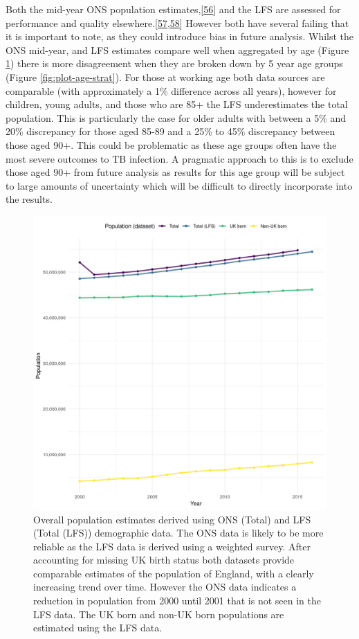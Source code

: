 \documentclass[11pt,twoside]{bristolthesis}
\begin{document}
  Both the mid-year ONS population estimates,{[}\protect\hyperlink{ref-storey2016}{56}{]} and the LFS are assessed for performance and quality elsewhere.{[}\protect\hyperlink{ref-NHSTraffordCCGGoverningBody2015}{57},\protect\hyperlink{ref-Date2012}{58}{]} However both have several failing that it is important to note, as they could introduce bias in future analysis. Whilst the ONS mid-year, and LFS estimates compare well when aggregated by age (Figure \ref{fig:plot-overall-pop}) there is more disagreement when they are broken down by 5 year age groups (Figure \ref{fig:plot-age-strat}). For those at working age both data sources are comparable (with approximately a 1\% difference across all years), however for children, young adults, and those who are 85+ the LFS underestimates the total population. This is particularly the case for older adults with between a 5\% and 20\% discrepancy for those aged 85-89 and a 25\% to 45\% discrepancy between those aged 90+. This could be problematic as these age groups often have the most severe outcomes to TB infection. A pragmatic approach to this is to exclude those aged 90+ from future analysis as results for this age group will be subject to large amounts of uncertainty which will be difficult to directly incorporate into the results.
  \begin{figure}
  
  {\centering \includegraphics[width=0.8\linewidth,]{chapters/tb-epi-england/figures/plot-overall-pop} 
  
  }
  
  \caption[Overall population estimates derived using ONS and LFS demographic data.]{Overall population estimates derived using ONS (Total) and LFS (Total (LFS)) demographic data. The ONS data is likely to be more reliable as the LFS data is derived using a weighted survey. After accounting for missing UK birth status both datasets provide comparable estimates of the population of England, with a clearly increasing trend over time. However the ONS data indicates a reduction in population from 2000 until 2001 that is not seen in the LFS data. The UK born and non-UK born populations are estimated using the LFS data.}\label{fig:plot-overall-pop}
  \end{figure}
\end{document}
